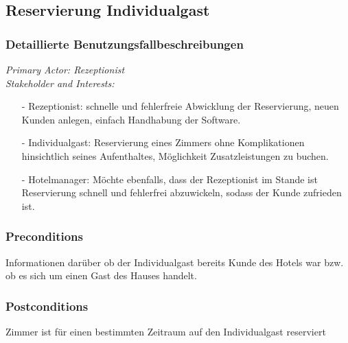 \documentclass[./detailed_overview_usecases.tex]{subfiles}
\begin{document}
    \subsection{Reservierung Individualgast}
    \subsubsection{Detaillierte Benutzungsfallbeschreibungen}
    \textit{Primary Actor: Rezeptionist}
    \\
    \textit{Stakeholder and Interests:}
    \begin{itemize}
        \item[-] Rezeptionist: schnelle und fehlerfreie Abwicklung der Reservierung, neuen Kunden anlegen, einfach Handhabung der Software.
        \item[-] Individualgast: Reservierung eines Zimmers ohne Komplikationen hinsichtlich seines Aufenthaltes, Möglichkeit Zusatzleistungen zu buchen.
        \item[-] Hotelmanager: Möchte ebenfalls, dass der Rezeptionist im Stande ist Reservierung schnell und fehlerfrei abzuwickeln, sodass der Kunde zufrieden ist.
    \end{itemize}

    \subsubsection*{Preconditions}
    Informationen darüber ob der Individualgast bereits Kunde des Hotels war bzw. ob es sich um einen Gast des Hauses handelt.

    \subsubsection*{Postconditions}
    Zimmer ist für einen bestimmten Zeitraum auf den Individualgast reserviert
\end{document}
